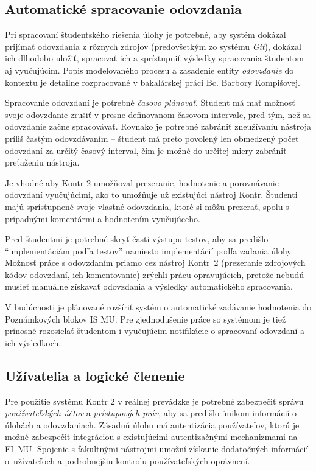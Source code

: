 \documentclass[
  digital, %
  oneside, %
  table,   %
  lof,     %
  lot,   %
]{fithesis3}
\begin{document}
\subsection{Automatické spracovanie odovzdania}

Pri spracovaní študentského riešenia úlohy je potrebné, aby systém dokázal prijímať odovzdania z rôznych zdrojov (predovšetkým zo systému \emph{Git}), dokázal ich dlhodobo uložiť, spracovať ich a sprístupniť výsledky spracovania študentom aj vyučujúcim. Popis modelovaného procesu a zasadenie entity \textit{odovzdanie} do kontextu je detailne rozpracované v bakalárskej práci Bc. Barbory Kompišovej\cite{kontr-portal}.

Spracovanie odovzdaní je potrebné \emph{časovo plánovať}. Študent má mať možnosť svoje odovzdanie zrušiť v presne definovanom časovom intervale, pred tým, než sa odovzdanie začne spracovávať. Rovnako je potrebné zabrániť zneužívaniu nástroja príliš častým odovzdávaním -- študent má preto povolený len obmedzený počet odovzdaní za určitý časový interval, čím je možné do určitej miery zabrániť preťaženiu nástroja.

Je vhodné aby Kontr 2 umožňoval prezeranie, hodnotenie a porovnávanie odovzdaní vyučujúcimi, ako to umožňuje už existujúci nástroj Kontr.
Študenti majú sprístupnené svoje vlastné odovzdania, ktoré si môžu prezerať, spolu s prípadnými komentármi a hodnotením vyučujúceho. 

Pred študentmi je potrebné skryť časti výstupu testov, aby sa predišlo "`implementáciám podľa testov"' namiesto implementácií podľa zadania úlohy. Možnosť práce s odovzdaním priamo cez nástroj Kontr~2 (prezeranie zdrojových kódov odovzdaní, ich komentovanie) zrýchli prácu opravujúcich, pretože nebudú musieť manuálne získavať odovzdania a výsledky automatického spracovania. 

V budúcnosti je plánované rozšíriť systém o automatické zadávanie hodnotenia do Poznámkových blokov IS MU. Pre zjednodušenie práce so systémom je tiež prínosné rozosielať študentom i vyučujúcim notifikácie o spracovaní odovzdaní a ich výsledkoch. 

\subsection{Užívatelia a logické členenie}

Pre použitie systému Kontr 2 v reálnej prevádzke je potrebné zabezpečiť správu \emph{používateľských účtov} a \emph{prístupových práv}, aby sa predišlo únikom informácií o úlohách a odovzdaniach. Zásadnú úlohu má autentizácia používateľov, ktorú je možné zabezpečiť integráciou s existujúcimi autentizačnými mechanizmami na FI~MU. Spojenie s fakultnými nástrojmi umožní získanie dodatočných informácií o~užívateľoch a podrobnejšiu kontrolu používateľských oprávnení.
\end{document}
